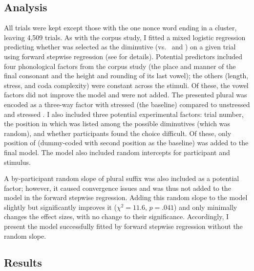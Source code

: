 \documentclass[output=paper,colorlinks,citecolor=brown
]{langscibook}
\begin{document}
\subsection{Analysis}
All trials were kept except those with the one nonce word ending in a cluster, leaving 4,509 trials. As with the corpus study, I fitted a mixed logistic regression predicting whether \ok{} was selected as the diminutive (vs.\ \ik{} and \chik) on a given trial using forward stepwise regression (see  for details). Potential predictors included four phonological factors from the corpus study (the place and manner of the final consonant and the height and rounding of its last vowel); the others (length, stress, and coda complexity) were constant across the stimuli. Of these, the vowel factors did not improve the model and were not added. The presented plural was encoded as a three-way factor with stressed \plsi{} (the baseline) compared to unstressed \pli{} and stressed \pla. %
I also included three potential experimental factors: trial number, the position in which \ok{} was listed among the possible diminutives (which was random), and whether participants found the choice difficult. Of these, only position of \ok{} (dummy-coded with second position as the baseline) was added to the final model. The model also included random intercepts for participant and stimulus.

A by-participant random slope of plural suffix was also included as a potential factor; however, it caused convergence issues and was thus not added to the model in the forward stepwise regression. Adding this random slope to the model slightly but significantly improves it ($\chi^2=11.6$, $p=.041$) and only minimally changes the effect sizes, with no change to their significance. Accordingly, I present the model successfully fitted by forward stepwise regression without the random slope.

\subsection{Results}
\end{document}
